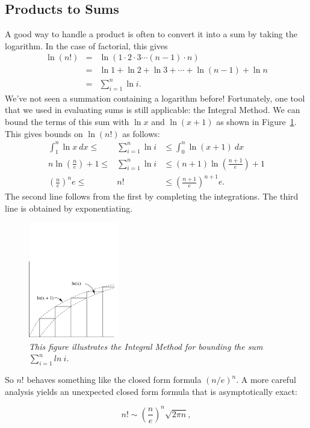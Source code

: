 \subsection{Products to Sums}

A good way to handle a product is often to convert it into a sum by taking
the logarithm.  In the case of factorial, this gives
\begin{eqnarray*}
\ln (n!) 
       & = & \ln(1 \cdot 2 \cdot 3 \cdots (n-1) \cdot n) \\
       & = & \ln 1 + \ln 2 + \ln 3 + \cdots + \ln(n-1) + \ln n \\
       & = & \sum_{i=1}^n \ln i.
\end{eqnarray*}
We've not seen a summation containing a logarithm before!
Fortunately, one tool that we used in evaluating sums is still
applicable: the Integral Method.  We can bound the terms of this sum
with $\ln x$ and $\ln(x+1)$ as shown in Figure~\ref{fig:integral2}.
This gives bounds on $\ln(n!)$ as follows:
\begin{eqnarray*}
\int_1^n \ln x \ dx \leq & \sum_{i=1}^n \ln i & \leq \int_0^n \ln(x+1) \ dx \\
n \ln(\frac{n}{e}) + 1 \leq & \sum_{i=1}^n \ln i & \leq (n+1) \ln\left(\frac{n+1}{e}\right) + 1 \\
\left(\frac{n}{e}\right)^n e \leq & n! & \leq  \left(\frac{n+1}{e}\right)^{n+1} e.
\end{eqnarray*}
The second line follows from the first by completing the integrations.
The third line is obtained by exponentiating.

\begin{figure}[htbp]
\centerline{%
\includegraphics[height=2in]{figures/integral2}
}
\caption{\em This figure illustrates the Integral Method for bounding
the sum $\sum_{i=1}^n ln \ i$.}
\label{fig:integral2}
\end{figure}

So $n!$ behaves something like the closed form formula $(n/e)^n$.
A more careful analysis yields an unexpected closed form formula that is
asymptotically exact:
\begin{lemma*}
\begin{equation}\label{nfacsim}
n! \sim \left(\frac{n}{e}\right)^n \sqrt{2 \pi n},
\end{equation}
\end{lemma*}

